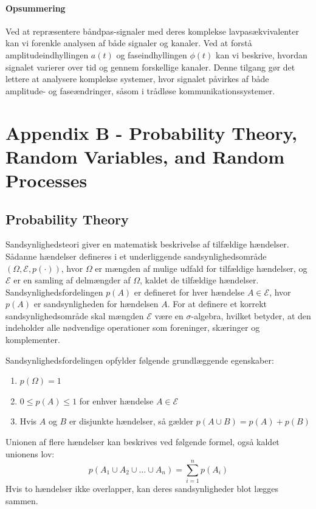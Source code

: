 \documentclass[a4paper,12pt]{book}
\begin{document}
	\subsubsection{Opsummering}
	Ved at repræsentere båndpas-signaler med deres komplekse lavpasækvivalenter kan vi forenkle analysen af både signaler og kanaler. Ved at forstå amplitudeindhyllingen \( a(t) \) og faseindhyllingen \( \phi(t) \) kan vi beskrive, hvordan signalet varierer over tid og gennem forskellige kanaler.
	\newline\newline\noindent
	Denne tilgang gør det lettere at analysere komplekse systemer, hvor signalet påvirkes af både amplitude- og faseændringer, såsom i trådløse kommunikationssystemer.
	
	
	\chapter{Appendix B - Probability Theory, Random Variables, and Random Processes}
	\section{Probability Theory}
	Sandsynlighedsteori giver en matematisk beskrivelse af tilfældige hændelser. Sådanne hændelser defineres i et underliggende sandsynlighedsområde \( (\Omega, \mathcal{E}, p(\cdot)) \), hvor \( \Omega \) er mængden af mulige udfald for tilfældige hændelser, og \( \mathcal{E} \) er en samling af delmængder af \( \Omega \), kaldet de tilfældige hændelser. Sandsynlighedsfordelingen \( p(A) \) er defineret for hver hændelse \( A \in \mathcal{E} \), hvor \( p(A) \) er sandsynligheden for hændelsen \( A \). For at definere et korrekt sandsynlighedsområde skal mængden \( \mathcal{E} \) være en \(\sigma\)-algebra, hvilket betyder, at den indeholder alle nødvendige operationer som foreninger, skæringer og komplementer.
	
	Sandsynlighedsfordelingen opfylder følgende grundlæggende egenskaber:
	\begin{enumerate}
		\item \( p(\Omega) = 1 \)
		\item \( 0 \leq p(A) \leq 1 \) for enhver hændelse \( A \in \mathcal{E} \)
		\item Hvis \( A \) og \( B \) er disjunkte hændelser, så gælder \( p(A \cup B) = p(A) + p(B) \)
	\end{enumerate}
	
	Unionen af flere hændelser kan beskrives ved følgende formel, også kaldet unionens lov:
	\[
	p(A_1 \cup A_2 \cup \ldots \cup A_n) = \sum_{i=1}^{n} p(A_i)
	\]
	Hvis to hændelser ikke overlapper, kan deres sandsynligheder blot lægges sammen.
	
\end{document}
